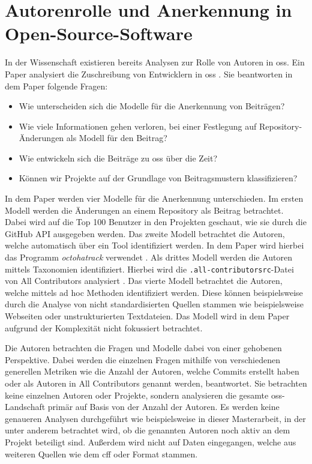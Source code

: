 \section{Autorenrolle und Anerkennung in Open-Source-Software}
\label{sec:autorenrolle-oss}
In der Wissenschaft existieren bereits Analysen zur Rolle von Autoren in \gls{oss}.
Ein Paper analysiert die Zuschreibung von Entwicklern in \gls{oss} \autocite{young_which_2021}.
Sie beantworten in dem Paper folgende Fragen:

\begin{itemize}
  \item Wie unterscheiden sich die Modelle für die Anerkennung von Beiträgen?
  \item Wie viele Informationen gehen verloren, bei einer Festlegung auf Repository-Änderungen als Modell für den Beitrag?
  \item Wie entwickeln sich die Beiträge zu \gls{oss} über die Zeit?
  \item Können wir Projekte auf der Grundlage von Beitragsmustern klassifizieren?
\end{itemize}

In dem Paper werden vier Modelle für die Anerkennung unterschieden.
Im ersten Modell werden die Änderungen an einem Repository als Beitrag betrachtet.
Dabei wird auf die Top 100 Benutzer in den Projekten geschaut, wie sie durch die GitHub API ausgegeben werden.
Das zweite Modell betrachtet die Autoren, welche automatisch über ein Tool identifiziert werden.
In dem Paper wird hierbei das Programm \textit{octohatrack} verwendet \autocites{young_which_2021}{noauthor_labhroctohatrack_2024}.
Als drittes Modell werden die Autoren mittels Taxonomien identifiziert.
Hierbei wird die \texttt{.all-contributorsrc}-Datei von \glqq All Contributors\grqq{} analysiert \autocites{young_which_2021}{all_contributors_recognize_2024}.
Das vierte Modell betrachtet die Autoren, welche mittels ad hoc Methoden identifiziert werden.
Diese können beispielsweise durch die Analyse von nicht standardisierten Quellen stammen wie beispielsweise Webseiten oder unstrukturierten Textdateien.
Das Modell wird in dem Paper aufgrund der Komplexität nicht fokussiert betrachtet.

Die Autoren betrachten die Fragen und Modelle dabei von einer gehobenen Perspektive.
Dabei werden die einzelnen Fragen mithilfe von verschiedenen generellen Metriken wie die Anzahl der Autoren, welche Commits erstellt haben oder als Autoren in \glqq All Contributors\grqq{} genannt werden, beantwortet.
Sie betrachten keine einzelnen Autoren oder Projekte, sondern analysieren die gesamte \gls{oss}-Landschaft primär auf Basis von der Anzahl der Autoren.
Es werden keine genaueren Analysen durchgeführt wie beispielsweise in dieser Masterarbeit, in der unter anderem betrachtet wird, ob die genannten Autoren noch aktiv an dem Projekt beteiligt sind.
Außerdem wird nicht auf Daten eingegangen, welche aus weiteren Quellen wie dem \gls{cff} oder  Format stammen.
